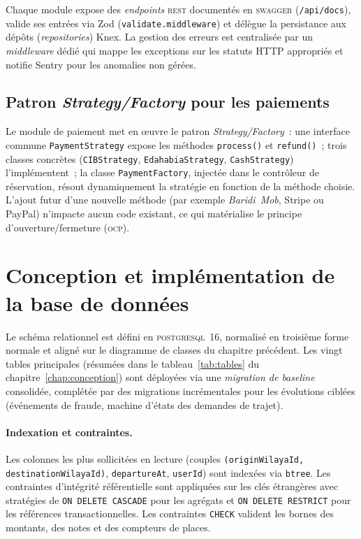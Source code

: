 \documentclass[12pt, a4paper, oneside]{report}
\begin{document}
Chaque module expose des \textit{endpoints} \textsc{rest} documentés en \textsc{swagger} (\texttt{/api/docs}), valide ses entrées via Zod (\texttt{validate.middleware}) et délègue la persistance aux dépôts (\textit{repositories}) Knex. La gestion des erreurs est centralisée par un \textit{middleware} dédié qui mappe les exceptions sur les statuts HTTP appropriés et notifie Sentry pour les anomalies non gérées.

\subsection{Patron \textit{Strategy/Factory} pour les paiements}

Le module de paiement met en œuvre le patron \textit{Strategy/Factory}~: une interface commune \texttt{PaymentStrategy} expose les méthodes \texttt{process()} et \texttt{refund()}~; trois classes concrètes (\texttt{CIBStrategy}, \texttt{EdahabiaStrategy}, \texttt{CashStrategy}) l'implémentent~; la classe \texttt{PaymentFactory}, injectée dans le contrôleur de réservation, résout dynamiquement la stratégie en fonction de la méthode choisie. L'ajout futur d'une nouvelle méthode (par exemple \textit{Baridi~Mob}, Stripe ou PayPal) n'impacte aucun code existant, ce qui matérialise le principe d'ouverture/fermeture (\textsc{ocp}).

\section{Conception et implémentation de la base de données}
\label{sec:realisation-bdd}

Le schéma relationnel est défini en \textsc{postgresql}~16, normalisé en troisième forme normale et aligné sur le diagramme de classes du chapitre précédent. Les vingt tables principales (résumées dans le tableau~\ref{tab:tables} du chapitre~\ref{chap:conception}) sont déployées via une \textit{migration de baseline} consolidée, complétée par des migrations incrémentales pour les évolutions ciblées (événements de fraude, machine d'états des demandes de trajet).

\paragraph{Indexation et contraintes.} Les colonnes les plus sollicitées en lecture (couples \texttt{(originWilayaId, destinationWilayaId)}, \texttt{departureAt}, \texttt{userId}) sont indexées via \texttt{btree}. Les contraintes d'intégrité référentielle sont appliquées sur les clés étrangères avec stratégies de \texttt{ON DELETE CASCADE} pour les agrégats et \texttt{ON DELETE RESTRICT} pour les références transactionnelles. Les contraintes \texttt{CHECK} valident les bornes des montants, des notes et des compteurs de places.
\end{document}
